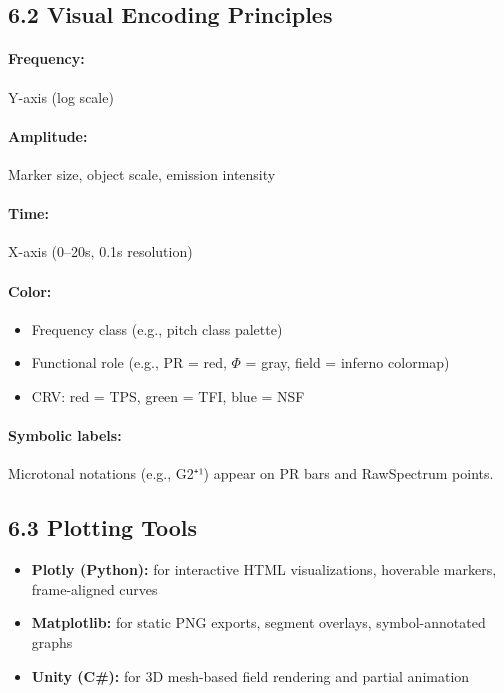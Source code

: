\documentclass[10pt]{article}
\begin{document}
\subsection*{6.2 Visual Encoding Principles}

\paragraph{Frequency:} Y-axis (log scale)  
\paragraph{Amplitude:} Marker size, object scale, emission intensity  
\paragraph{Time:} X-axis (0–20s, 0.1s resolution)  
\paragraph{Color:}  
\begin{itemize}
  \item Frequency class (e.g., pitch class palette)
  \item Functional role (e.g., PR = red, $\Phi$ = gray, field = inferno colormap)
  \item CRV: red = TPS, green = TFI, blue = NSF
\end{itemize}

\paragraph{Symbolic labels:} Microtonal notations (e.g., G2⁺¹) appear on PR bars and RawSpectrum points.

\subsection*{6.3 Plotting Tools}

\begin{itemize}
    \item \textbf{Plotly (Python):} for interactive HTML visualizations, hoverable markers, frame-aligned curves
    \item \textbf{Matplotlib:} for static PNG exports, segment overlays, symbol-annotated graphs
    \item \textbf{Unity (C\#):} for 3D mesh-based field rendering and partial animation
\end{itemize}
\end{document}
